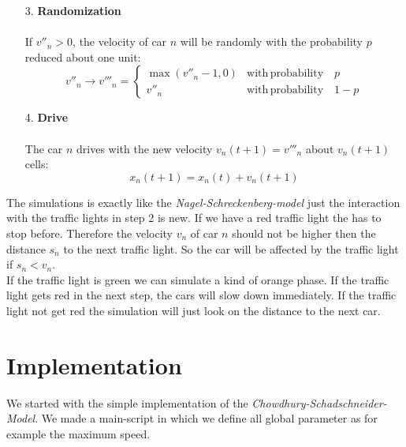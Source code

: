 \documentclass[11pt]{article}
\begin{document}
\begin{itemize}
\begin{itemize}
\end{itemize}
\item[3.]  \textbf{Randomization}\\
\\
If $v''_n>0$, the velocity of car $n$ will be randomly with the probability $p$ reduced about one unit:
\begin{equation}
v''_n \rightarrow v'''_n=
\begin{cases}
\max(v''_n-1,0) & \mathrm{with\,probability} \quad p\\
v''_n & \mathrm{with\,probability} \quad 1-p
\end{cases}
\label{hangb}
\end{equation}
\item[4.] \textbf{Drive}\\
\\
The car $n$ drives with the new velocity $v_n(t+1)=v'''_n$ about $v_n(t+1)$ cells:
\begin{equation}
x_n(t+1)=x_n(t)+v_n(t+1)
\label{drive}
\end{equation}
\end{itemize}
The simulations is exactly like the \textit{Nagel-Schreckenberg-model} just the interaction with the traffic lights in step 2 is new. If we have a red traffic light the has to stop before. Therefore the velocity $v_n$ of car $n$ should not be higher then the distance $s_n$ to the next traffic light. So the car will be affected by the traffic light if $s_n<v_n$.\\
If the traffic light is green we can simulate a kind of orange phase. If the traffic light gets red in the next step, the cars will slow down immediately. If the traffic light not get red the simulation will just look on the distance to the next car.

\section{Implementation}

We started with the simple implementation of the \textit{Chowdhury-Schadschneider-Model}. We made a main-script in which we define all global parameter as for example the maximum speed.\\
\end{document}
